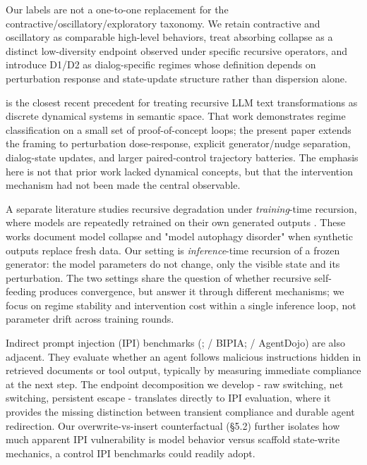 \documentclass{article}
\theoremstyle{plain}
\theoremstyle{definition}
\begin{document}
Our labels are not a one-to-one replacement for the contractive/oscillatory/exploratory taxonomy. We retain contractive and oscillatory as comparable high-level behaviors, treat absorbing collapse as a distinct low-diversity endpoint observed under specific recursive operators, and introduce D1/D2 as dialog-specific regimes whose definition depends on perturbation response and state-update structure rather than dispersion alone.

\citet{arxiv251210350} is the closest recent precedent for treating recursive LLM text transformations as discrete dynamical systems in semantic space. That work demonstrates regime classification on a small set of proof-of-concept loops; the present paper extends the framing to perturbation dose-response, explicit generator/nudge separation, dialog-state updates, and larger paired-control trajectory batteries. The emphasis here is not that prior work lacked dynamical concepts, but that the intervention mechanism had not been made the central observable.

A separate literature studies recursive degradation under \textit{training}-time recursion, where models are repeatedly retrained on their own generated outputs \citep{arxiv230517493,arxiv230701850}. These works document model collapse and "model autophagy disorder" when synthetic outputs replace fresh data. Our setting is \textit{inference}-time recursion of a frozen generator: the model parameters do not change, only the visible state and its perturbation. The two settings share the question of whether recursive self-feeding produces convergence, but answer it through different mechanisms; we focus on regime stability and intervention cost within a single inference loop, not parameter drift across training rounds.

Indirect prompt injection (IPI) benchmarks (\citet{arxiv230212173}; \citet{arxiv231214197} / BIPIA; \citet{arxiv240613352} / AgentDojo) are also adjacent. They evaluate whether an agent follows malicious instructions hidden in retrieved documents or tool output, typically by measuring immediate compliance at the next step. The endpoint decomposition we develop - raw switching, net switching, persistent escape - translates directly to IPI evaluation, where it provides the missing distinction between transient compliance and durable agent redirection. Our overwrite-vs-insert counterfactual (§5.2) further isolates how much apparent IPI vulnerability is model behavior versus scaffold state-write mechanics, a control IPI benchmarks could readily adopt.
\end{document}
